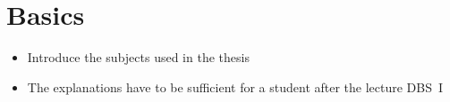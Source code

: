 \section{Basics}
\begin{itemize}
  \item Introduce the subjects used in the thesis
  \item The explanations have to be sufficient for a student after the lecture DBS~I
\end{itemize}


